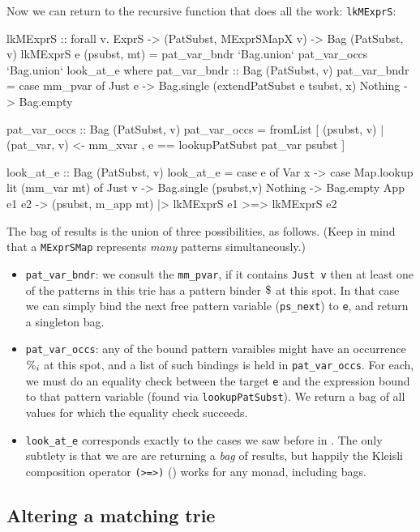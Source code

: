 \documentclass[acmsmall]{acmart}
\theoremstyle{theorem}
\theoremstyle{definition}
\theoremstyle{remark}
\begin{document}
Now we can return to the recursive function that does all the work: \lstinline{lkMExprS}:
\begin{code}
lkMExprS :: forall v. ExprS -> (PatSubst, MExprSMapX v) -> Bag (PatSubst, v)
lkMExprS e (psubst, mt)
  = pat_var_bndr `Bag.union` pat_var_occs `Bag.union` look_at_e
  where
     pat_var_bndr :: Bag (PatSubst, v)
     pat_var_bndr = case mm_pvar of
                      Just e  -> Bag.single (extendPatSubst e tsubst, x)
                      Nothing -> Bag.empty

     pat_var_occs :: Bag (PatSubst, v)
     pat_var_occs = fromList [ (psubst, v)
                             | (pat_var, v) <- mm_xvar
                             , e == lookupPatSubst pat_var psubst ]

     look_at_e :: Bag (PatSubst, v)
     look_at_e = case e of
        Var x     -> case Map.lookup lit (mm_var mt) of
                       Just v  -> Bag.single (psubst,v)
                       Nothing -> Bag.empty
        App e1 e2 -> (psubst, m_app mt) |> lkMExprS e1 >=> lkMExprS e2
\end{code}
The bag of results is the union of three possibilities, as follows. (Keep in mind that a \lstinline{MExprSMap} represents \emph{many} patterns simultaneously.)
\begin{itemize}
\item \lstinline{pat_var_bndr}: we consult the \lstinline{mm_pvar}, if it contains \lstinline{Just v} then at least one of the patterns in this trie has a pattern binder $\$_{}$ at this spot.  In that case we can simply bind the next free pattern variable (\lstinline{ps_next}) to \lstinline{e}, and return a singleton bag.
\item \lstinline{pat_var_occs}: any of the bound pattern varaibles might have an occurrence $\%_{i}$ at this spot, and a list of such bindings is held in \lstinline{pat_var_occs}.  For each, we must do an equality check between the target \lstinline{e} and the expression bound to that pattern variable (found via \lstinline{lookupPatSubst}).  We return a bag of all values for which the equality check succeeds.
  \item \lstinline{look_at_e} corresponds exactly to the cases we saw before in .   The only subtlety is that we are are returning a \emph{bag} of results, but happily the Kleisli composition operator \lstinline{(>=>)} () works for any monad, including bags.
\end{itemize}

\subsection{Altering a matching trie}
\end{document}
